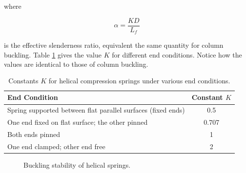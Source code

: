 \documentclass[
10pt,
a4paper,
openany,
svgnames,
]{book}
\begin{document}
where

\begin{equation*}
  \alpha = \frac{KD}{L_f}
\end{equation*}

is the effective slenderness ratio, equivalent the same quantity for column buckling. Table \cref{table: spring buckling} gives the value $K$ for different end conditions. Notice how the values are identical to those of column buckling.

\begin{table}
  \centering
  {\renewcommand{\arraystretch}{1.2}
  \begin{tabular}{lc}
    \toprule
    End Condition & Constant $K$ \\
    \midrule
    Spring supported between flat parallel surfaces (fixed ends) & 0.5 \\
    One end fixed on flat surface; the other pinned & 0.707 \\
    Both ends pinned & 1 \\
    One end clamped; other end free & 2 \\
    \bottomrule
  \end{tabular}}
  \caption{Constants $K$ for helical compression springs under various end conditions.}
  \label{table: spring buckling}
\end{table}

\begin{figure}[h]
  \centering
  \caption{Buckling stability of helical springs.}
  \label{fig: spring buckling}
\end{figure}
\end{document}
